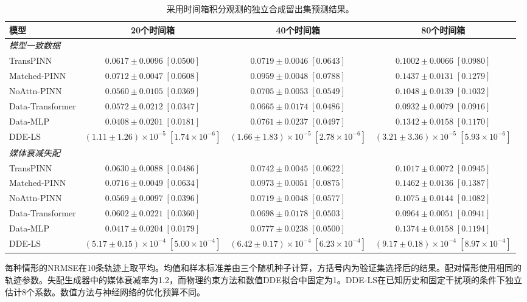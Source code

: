 \begin{table}[t]
\centering
\caption{采用时间箱积分观测的独立合成留出集预测结果。}
\label{tab:synthetic_forecast}
\footnotesize
\setlength{\tabcolsep}{4pt}
\renewcommand{\arraystretch}{1.08}
\begin{tabular*}{\textwidth}{@{\extracolsep{\fill}}lccc@{}}
\toprule
模型 & 20个时间箱 & 40个时间箱 & 80个时间箱 \\
\midrule
\multicolumn{4}{l}{\textit{模型一致数据}} \\
TransPINN & $0.0617\pm0.0096\;[0.0500]$ & $0.0719\pm0.0046\;[0.0643]$ & $0.1002\pm0.0066\;[0.0980]$ \\
Matched-PINN & $0.0712\pm0.0047\;[0.0608]$ & $0.0959\pm0.0048\;[0.0788]$ & $0.1437\pm0.0131\;[0.1279]$ \\
NoAttn-PINN & $0.0560\pm0.0105\;[0.0369]$ & $0.0705\pm0.0053\;[0.0549]$ & $0.1048\pm0.0139\;[0.1032]$ \\
Data-Transformer & $0.0572\pm0.0212\;[0.0347]$ & $0.0665\pm0.0174\;[0.0486]$ & $0.0932\pm0.0079\;[0.0916]$ \\
Data-MLP & $0.0408\pm0.0201\;[0.0181]$ & $0.0761\pm0.0237\;[0.0497]$ & $0.1342\pm0.0158\;[0.1170]$ \\
DDE-LS & $(1.11\pm1.26)\times10^{-5}\;[1.74\times10^{-6}]$ & $(1.66\pm1.83)\times10^{-5}\;[2.78\times10^{-6}]$ & $(3.21\pm3.36)\times10^{-5}\;[5.93\times10^{-6}]$ \\
\midrule
\multicolumn{4}{l}{\textit{媒体衰减失配}} \\
TransPINN & $0.0630\pm0.0088\;[0.0486]$ & $0.0742\pm0.0045\;[0.0622]$ & $0.1017\pm0.0072\;[0.0945]$ \\
Matched-PINN & $0.0716\pm0.0049\;[0.0634]$ & $0.0973\pm0.0051\;[0.0875]$ & $0.1462\pm0.0136\;[0.1387]$ \\
NoAttn-PINN & $0.0569\pm0.0097\;[0.0396]$ & $0.0719\pm0.0048\;[0.0577]$ & $0.1075\pm0.0144\;[0.1082]$ \\
Data-Transformer & $0.0602\pm0.0221\;[0.0360]$ & $0.0698\pm0.0178\;[0.0503]$ & $0.0964\pm0.0051\;[0.0941]$ \\
Data-MLP & $0.0417\pm0.0204\;[0.0179]$ & $0.0777\pm0.0238\;[0.0500]$ & $0.1374\pm0.0158\;[0.1194]$ \\
DDE-LS & $(5.17\pm0.15)\times10^{-4}\;[5.00\times10^{-4}]$ & $(6.42\pm0.17)\times10^{-4}\;[6.23\times10^{-4}]$ & $(9.17\pm0.18)\times10^{-4}\;[8.97\times10^{-4}]$ \\
\bottomrule
\end{tabular*}
\par\smallskip
\begin{minipage}{\textwidth}\footnotesize 每种情形的NRMSE在10条轨迹上取平均。均值和样本标准差由三个随机种子计算，方括号内为验证集选择后的结果。配对情形使用相同的轨迹参数。失配生成器中的媒体衰减率为1.2，而物理约束方法和数值DDE拟合中固定为1。DDE-LS在已知历史和固定干扰项的条件下独立估计8个系数。数值方法与神经网络的优化预算不同。\end{minipage}
\end{table}

